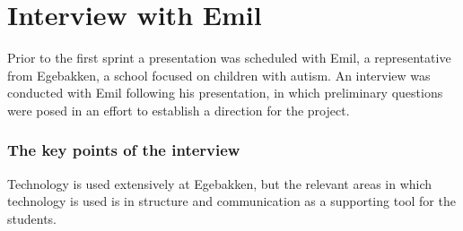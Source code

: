 \section{Interview with Emil}\label{interview-with-emil}
Prior to the first sprint a presentation was scheduled with Emil, a representative from Egebakken, a school focused on children with autism.
An interview was conducted with Emil following his presentation, in which preliminary questions were posed in an effort to establish a direction for the project.

\subsubsection{The key points of the interview}
Technology is used extensively at Egebakken, but the relevant areas in which technology is used is in structure and communication as a supporting tool for the students.

